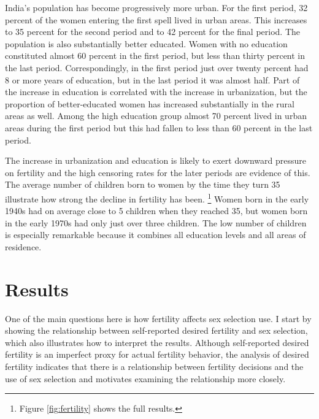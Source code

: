 \documentclass[12pt,letterpaper]{article}
\begin{document}
India's population has become progressively more urban.
For the first period, 32 percent of the women entering the first spell lived in urban areas.
This increases to 35 percent for the second period and to 42 percent for the final period.
The population is also substantially better educated.
Women with no education constituted almost 60 percent 
in the first period, but less than thirty percent in the last period.
Correspondingly, in the first period just over twenty percent had 8 or more 
years of education, but in the last period it was almost half.
Part of the increase in education is correlated with the increase in urbanization,
but the proportion of better-educated women has increased substantially
in the rural areas as well.
Among the high education group almost 70 percent lived in urban areas
during the first period but this had fallen to less than 60 percent
in the last period.

The increase in urbanization and education is likely to exert downward pressure
on fertility and the high censoring rates for the later periods are evidence of this.
The average number of children born to women by the time they turn 35 illustrate how
strong the decline in fertility has been.%
\footnote{
Figure \ref{fig:fertility} shows the full results.
}
Women born in the early 1940s had on average close to 5 children when 
they reached 35, but women born in the early 1970s had only just over three children.
The low number of children is especially remarkable because it combines
all education levels and all areas of residence.


\section{Results\label{sec:results}}



One of the main questions here is how fertility affects sex selection use.
I start by showing the relationship between self-reported desired fertility and sex 
selection, which also illustrates how to interpret the results.
Although self-reported desired fertility is an imperfect proxy for actual
fertility behavior, the analysis of desired fertility indicates that there is 
a relationship between fertility decisions and the use of sex selection and motivates 
examining the relationship more closely.
\end{document}
